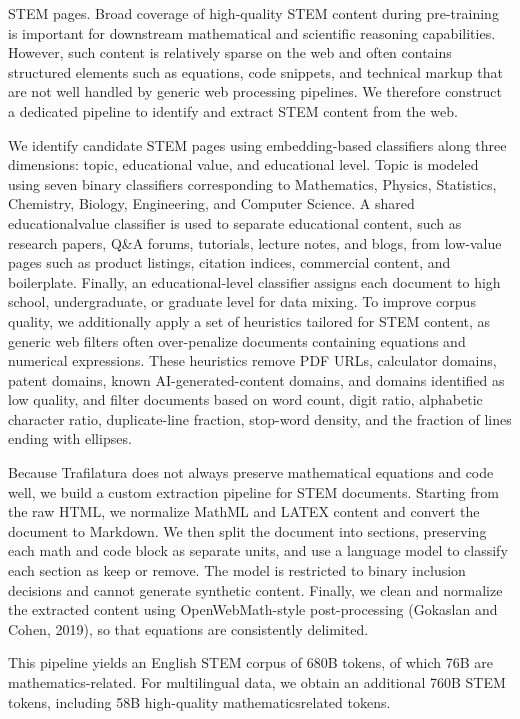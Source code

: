 \documentclass[
  10
]{article}
\begin{document}
STEM pages. Broad coverage of high-quality STEM content during
pre-training is important for downstream mathematical and scientific
reasoning capabilities. However, such content is relatively sparse on
the web and often contains structured elements such as equations, code
snippets, and technical markup that are not well handled by generic web
processing pipelines. We therefore construct a dedicated pipeline to
identify and extract STEM content from the web.

We identify candidate STEM pages using embedding-based classifiers along
three dimensions: topic, educational value, and educational level. Topic
is modeled using seven binary classifiers corresponding to Mathematics,
Physics, Statistics, Chemistry, Biology, Engineering, and Computer
Science. A shared educationalvalue classifier is used to separate
educational content, such as research papers, Q\&A forums, tutorials,
lecture notes, and blogs, from low-value pages such as product listings,
citation indices, commercial content, and boilerplate. Finally, an
educational-level classifier assigns each document to high school,
undergraduate, or graduate level for data mixing. To improve corpus
quality, we additionally apply a set of heuristics tailored for STEM
content, as generic web filters often over-penalize documents containing
equations and numerical expressions. These heuristics remove PDF URLs,
calculator domains, patent domains, known AI-generated-content domains,
and domains identified as low quality, and filter documents based on
word count, digit ratio, alphabetic character ratio, duplicate-line
fraction, stop-word density, and the fraction of lines ending with
ellipses.

Because Trafilatura does not always preserve mathematical equations and
code well, we build a custom extraction pipeline for STEM documents.
Starting from the raw HTML, we normalize MathML and LATEX content and
convert the document to Markdown. We then split the document into
sections, preserving each math and code block as separate units, and use
a language model to classify each section as keep or remove. The model
is restricted to binary inclusion decisions and cannot generate
synthetic content. Finally, we clean and normalize the extracted content
using OpenWebMath-style post-processing (Gokaslan and Cohen, 2019), so
that equations are consistently delimited.

This pipeline yields an English STEM corpus of 680B tokens, of which 76B
are mathematics-related. For multilingual data, we obtain an additional
760B STEM tokens, including 58B high-quality mathematicsrelated tokens.
\end{document}
